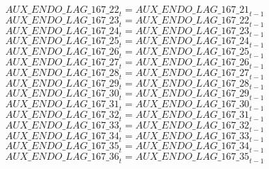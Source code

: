 \begin{dmath}
{AUX\_ENDO\_LAG\_167\_22}_{t}={AUX\_ENDO\_LAG\_167\_21}_{t-1}
\end{dmath}
\begin{dmath}
{AUX\_ENDO\_LAG\_167\_23}_{t}={AUX\_ENDO\_LAG\_167\_22}_{t-1}
\end{dmath}
\begin{dmath}
{AUX\_ENDO\_LAG\_167\_24}_{t}={AUX\_ENDO\_LAG\_167\_23}_{t-1}
\end{dmath}
\begin{dmath}
{AUX\_ENDO\_LAG\_167\_25}_{t}={AUX\_ENDO\_LAG\_167\_24}_{t-1}
\end{dmath}
\begin{dmath}
{AUX\_ENDO\_LAG\_167\_26}_{t}={AUX\_ENDO\_LAG\_167\_25}_{t-1}
\end{dmath}
\begin{dmath}
{AUX\_ENDO\_LAG\_167\_27}_{t}={AUX\_ENDO\_LAG\_167\_26}_{t-1}
\end{dmath}
\begin{dmath}
{AUX\_ENDO\_LAG\_167\_28}_{t}={AUX\_ENDO\_LAG\_167\_27}_{t-1}
\end{dmath}
\begin{dmath}
{AUX\_ENDO\_LAG\_167\_29}_{t}={AUX\_ENDO\_LAG\_167\_28}_{t-1}
\end{dmath}
\begin{dmath}
{AUX\_ENDO\_LAG\_167\_30}_{t}={AUX\_ENDO\_LAG\_167\_29}_{t-1}
\end{dmath}
\begin{dmath}
{AUX\_ENDO\_LAG\_167\_31}_{t}={AUX\_ENDO\_LAG\_167\_30}_{t-1}
\end{dmath}
\begin{dmath}
{AUX\_ENDO\_LAG\_167\_32}_{t}={AUX\_ENDO\_LAG\_167\_31}_{t-1}
\end{dmath}
\begin{dmath}
{AUX\_ENDO\_LAG\_167\_33}_{t}={AUX\_ENDO\_LAG\_167\_32}_{t-1}
\end{dmath}
\begin{dmath}
{AUX\_ENDO\_LAG\_167\_34}_{t}={AUX\_ENDO\_LAG\_167\_33}_{t-1}
\end{dmath}
\begin{dmath}
{AUX\_ENDO\_LAG\_167\_35}_{t}={AUX\_ENDO\_LAG\_167\_34}_{t-1}
\end{dmath}
\begin{dmath}
{AUX\_ENDO\_LAG\_167\_36}_{t}={AUX\_ENDO\_LAG\_167\_35}_{t-1}
\end{dmath}
